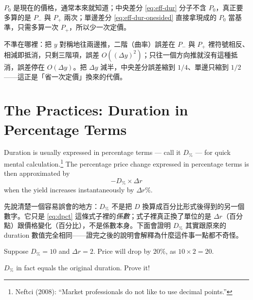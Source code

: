 \begin{remark}
	$P_{0}$ 是現在的價格，通常本來就知道；中央差分 \eqref{eq:eff-dur} 分子不含 $P_{0}$，真正要多算的是 $P_{-}$ 與 $P_{+}$ 兩次；單邊差分 \eqref{eq:eff-dur-onesided} 直接拿現成的 $P_{0}$ 當基準，只需多算一次 $P_{+}$，所以少一次定價。

	不準在哪裡：把 $y$ 對稱地往兩邊推，二階（曲率）誤差在 $P_{-}$ 與 $P_{+}$ 裡符號相反、相減即抵消，只剩三階項，誤差 $O((\Delta y)^{2})$；只往一個方向推就沒有這種抵消，誤差停在 $O(\Delta y)$。把 $\Delta y$ 減半，中央差分誤差縮到 $1/4$、單邊只縮到 $1/2$——這正是「省一次定價」換來的代價。
\end{remark}
\suppend

\section{The Practices: Duration in Percentage Terms}
\label{sec:practices-d}


Duration is usually expressed in percentage terms --- call it $D_{\%}$ --- for quick mental calculation.\footnote{Neftci (2008): ``Market professionals do not like to use decimal points.''}
The percentage price change expressed in percentage terms is then approximated by
\begin{equation}
	-D_{\%}\times\Delta r \label{eq:dpct}
\end{equation}
when the yield increases instantaneously by $\Delta r\%$.

\suppstart
\begin{remark}
	先說清楚一個容易誤會的地方：$D_{\%}$ 不是把 $D$ 換算成百分比形式後得到的另一個數字。它只是 \eqref{eq:dpct} 這條式子裡的\emph{係數}；式子裡真正換了單位的是 $\Delta r$（百分點）跟價格變化（百分比），不是係數本身。下面會證明 $D_{\%}$ 其實跟原來的 duration 數值完全相同——證完之後的說明會解釋為什麼這件事一點都不奇怪。
\end{remark}
\suppend

\begin{eg}
	Suppose $D_{\%}=10$ and $\Delta r=2$.
	Price will drop by $20\%$, as $10\times 2=20$.
\end{eg}

\begin{exercise}
	$D_{\%}$ in fact equals the original duration. Prove it!
\end{exercise}


